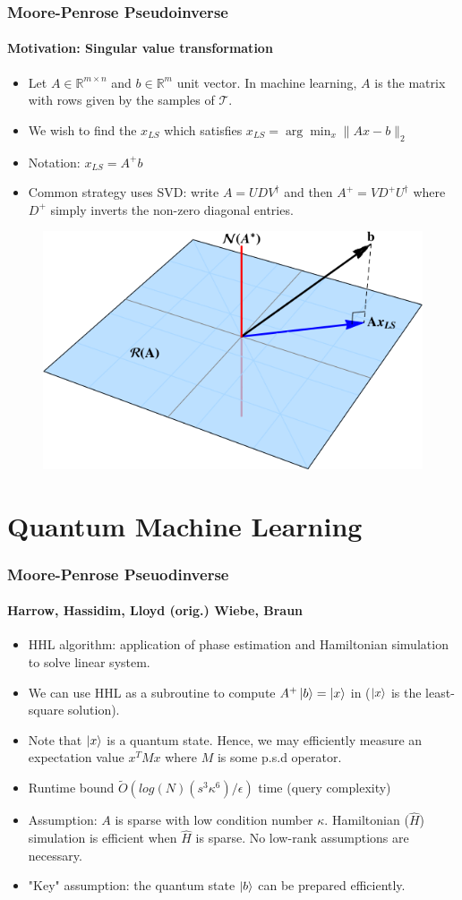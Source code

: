 \documentclass{beamer}
\newcommand\0{\mathbf{0}}
\newcommand\RR{\mathbb{R}}
\newcommand\<{\langle}
\renewcommand\>{\rangle}
\begin{document}
\begin{frame}
\frametitle{Moore-Penrose Pseudoinverse}
    \framesubtitle{Motivation: Singular value transformation}
    \begin{itemize}
    \item Let $A \in \RR^{m \times n}$ and $b \in \RR^m$ unit vector. In machine learning, $A$ is the matrix with rows given by the samples of $\mathcal{T}$. 
    \item We wish to find the $x_{LS}$ which satisfies $x_{LS} = \arg\min_{x} \| Ax - b \|_2$
    \item Notation: $x_{LS} = A^+ b$
    \pause
    \item Common strategy uses SVD: write $A = UDV^\dag$ and then $A^+ = VD^+U^\dag$ where $D^+$ simply inverts the non-zero diagonal entries.
    \end{itemize}
	\begin{figure}
   \includegraphics[width= 0.5\linewidth]{least-squares.png}	
\end{figure}
\end{frame}

\section{Quantum Machine Learning}

\begin{frame}
\frametitle{Moore-Penrose Pseuodinverse}
\framesubtitle{Harrow, Hassidim, Lloyd (orig.) Wiebe, Braun} 
\begin{itemize}
    \item HHL algorithm: application of phase estimation and Hamiltonian simulation to solve linear system.
    \item We can use HHL as a subroutine to compute $A^+ \ket{b} = \ket{x}$ in ($\ket{x}$ is the least-square solution).
    \item Note that $\ket{x}$ is a quantum state. Hence, we may efficiently measure an expectation value $x^T M x$ where $M$ is some p.s.d operator.
    \item Runtime bound $\tilde{O}(log(N)(s^3\kappa^6)/ \epsilon)$ time (query complexity)
    \item Assumption: $A$ is sparse with low condition number $\kappa$. Hamiltonian ($\hat{H}$) simulation is efficient when $\hat{H}$ is sparse. No low-rank assumptions are necessary.
    \item "Key" assumption: the quantum state $\ket{b}$ can be prepared efficiently.	
    

\end{itemize}
\end{frame}
\end{document}
